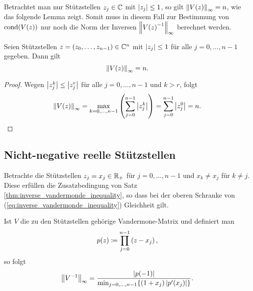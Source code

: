 Betrachtet man nur Stützstellen $z_j \in \mathbb{C}$ mit $\left\lvert z_j \right\rvert \leq 1$,
so gilt $\left\lVert \text{$V(z)$} \right\rVert_{\infty} = n$, wie das folgende Lemma zeigt.
Somit muss in diesem Fall zur Bestimmung von $\text{cond$(\text{$V(z)$})$}$ nur noch die
Norm der Inversen $\left\lVert \text{$V(z)$}^{-1} \right\rVert_{\infty}$ berechnet werden.

\begin{lemma}
    Seien Stützstellen $z = (z_0, \dots, z_{n-1}) \in \mathbb{C}^n$
    mit $\left\lvert z_j \right\rvert \leq 1$ für alle $j = 0, \dots, n-1$ gegeben.
    Dann gilt
    \[
        \left\lVert V(z) \right\rVert_{\infty} = n.
    \]
\end{lemma}

\begin{proof}
    Wegen $\left\lvert z_j^k \right\rvert \leq \left\lvert z_j^r \right\rvert$ für alle $j = 0, \dots, n-1$ und $k > r$, folgt
    \[
        \left\lVert V(z) \right\rVert_{\infty} = \max_{k=0,\dots,n-1} \left( \sum_{j=0}^{n-1} \left\lvert z_j^k \right\rvert \right) = \sum_{j=0}^{n-1} \left\lvert z_j^0 \right\rvert = n.
    \]
\end{proof}

\subsection{Nicht-negative reelle Stützstellen}
Betrachte die Stützstellen $z_j = x_j \in \mathbb{R}_+$ für $j = 0, \dots, n-1$
und $x_k \neq x_j$ für $k \neq j$.
Diese erfüllen die Zusatzbedingung von Satz \ref{thm:inverse_vandermonde_inequality},
so dass bei der oberen Schranke von (\ref{eq:inverse_vandermonde_inequality})
Gleichheit gilt.
\begin{lemma}
    \label{lemma:nonnegative_real_nodes}
    Ist $V$ die zu den Stützstellen gehörige Vandermone-Matrix und definiert man
    \[
        p(z) \coloneqq \prod_{j=0}^{n-1} \left( z - x_j \right),
    \]
    so folgt
    \[
        \left\lVert V^{-1} \right\rVert_{\infty} = \frac{ \left\lvert p(-1) \right\rvert}{\min_{j=0, \dots, n-1} \{ (1+x_j) \left\lvert p^{\prime}(x_j) \right\rvert \}}.
    \]
\end{lemma}

